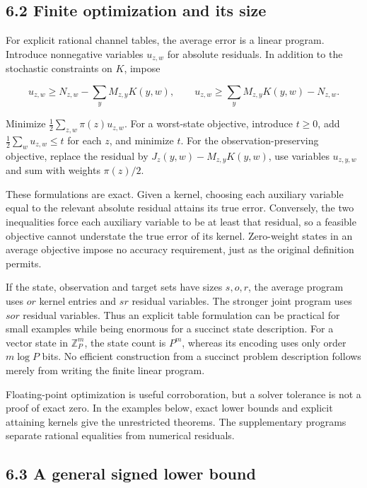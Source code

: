 \documentclass[
]{article}
\begin{document}
\subsection{6.2 Finite optimization and its
size}\label{finite-optimization-and-its-size}

For explicit rational channel tables, the average error is a linear
program. Introduce nonnegative variables \(u_{z,w}\) for absolute
residuals. In addition to the stochastic constraints on \(K\), impose

\[
u_{z,w}\ge N_{z,w}-\sum_y M_{z,y}K(y,w),
\qquad
u_{z,w}\ge\sum_y M_{z,y}K(y,w)-N_{z,w}.
\]

Minimize \(\tfrac12\sum_{z,w}\pi(z)u_{z,w}\). For a worst-state
objective, introduce \(t\ge0\), add \(\tfrac12\sum_wu_{z,w}\le t\) for
each \(z\), and minimize \(t\). For the observation-preserving
objective, replace the residual by \(J_z(y,w)-M_{z,y}K(y,w)\), use
variables \(u_{z,y,w}\) and sum with weights \(\pi(z)/2\).

These formulations are exact. Given a kernel, choosing each auxiliary
variable equal to the relevant absolute residual attains its true error.
Conversely, the two inequalities force each auxiliary variable to be at
least that residual, so a feasible objective cannot understate the true
error of its kernel. Zero-weight states in an average objective impose
no accuracy requirement, just as the original definition permits.

If the state, observation and target sets have sizes \(s,o,r\), the
average program uses \(or\) kernel entries and \(sr\) residual
variables. The stronger joint program uses \(sor\) residual variables.
Thus an explicit table formulation can be practical for small examples
while being enormous for a succinct state description. For a vector
state in \(\mathbb Z_P^m\), the state count is \(P^m\), whereas its
encoding uses only order \(m\log P\) bits. No efficient construction
from a succinct problem description follows merely from writing the
finite linear program.

Floating-point optimization is useful corroboration, but a solver
tolerance is not a proof of exact zero. In the examples below, exact
lower bounds and explicit attaining kernels give the unrestricted
theorems. The supplementary programs separate rational equalities from
numerical residuals.

\subsection{6.3 A general signed lower
bound}\label{a-general-signed-lower-bound}
\end{document}
